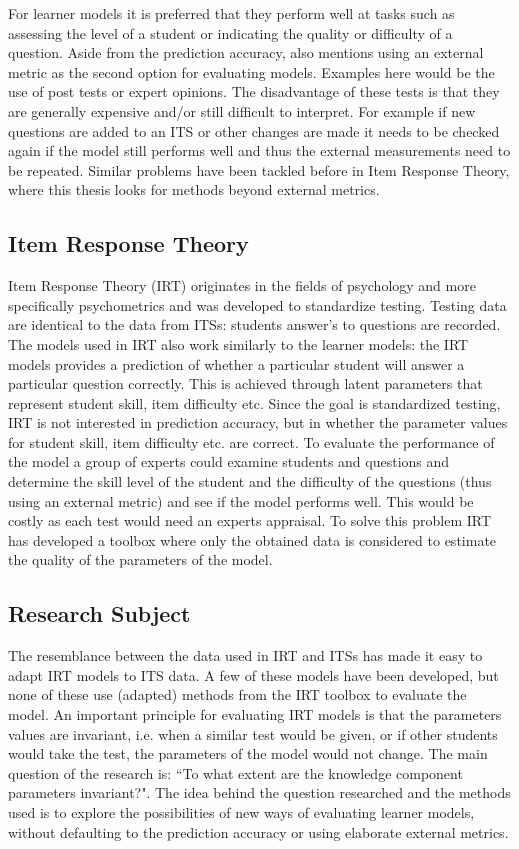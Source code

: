 \documentclass{scrartcl}
\begin{document}
For learner models it is preferred that they perform well at tasks such as assessing the level of a student or indicating the quality or difficulty of a question. Aside from the prediction accuracy, \cite{modelreview} also mentions using an external metric as the second option for evaluating models. Examples here would be the use of post tests or expert opinions. The disadvantage of these tests is that they are generally expensive and/or still difficult to interpret. For example if new questions are added to an ITS or other changes are made it needs to be checked again if the model still performs well and thus the external measurements need to be repeated. Similar problems have been tackled before in Item Response Theory, where this thesis looks for methods beyond external metrics.

\subsection{Item Response Theory}
Item Response Theory (IRT) originates in the fields of psychology and more specifically psychometrics and was developed to standardize testing. Testing data are identical to the data from ITSs: students answer's to questions are recorded. The models used in IRT also work similarly to the learner models: the IRT models provides a prediction of whether a particular student will answer a particular question correctly. This is achieved through latent parameters that represent student skill, item difficulty etc. Since the goal is standardized testing, IRT is not interested in prediction accuracy, but in whether the parameter values for student skill, item difficulty etc. are correct. To evaluate the performance of the model a group of experts could examine students and questions and determine the skill level of the student and the difficulty of the questions (thus using an external metric) and see if the model performs well. This would be costly as each test would need an experts appraisal. To solve this problem IRT has developed a toolbox where only the obtained data is considered to estimate the quality of the parameters of the model.  

\subsection{Research Subject}
The resemblance between the data used in IRT and ITSs has made it easy to adapt IRT models to ITS data. A few of these models have been developed, but none of these use (adapted) methods from the IRT toolbox to evaluate the model. An important principle for evaluating IRT models is that the parameters values are invariant, i.e. when a similar test would be given, or if other students would take the test, the parameters of the model would not change. The main question of the research is: ``To what extent are the knowledge component parameters invariant?". The idea behind the question researched and the methods used is to explore the possibilities of new ways of evaluating learner models, without defaulting to the prediction accuracy or using elaborate external metrics.
\end{document}
